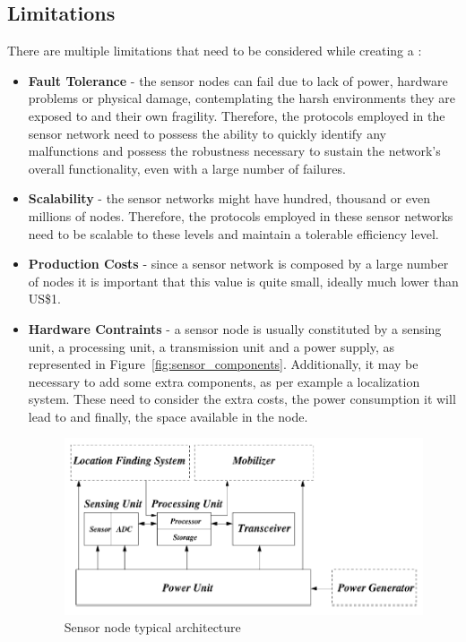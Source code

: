 


\subsection{Limitations}
\label{subsec:wsn_limitations}
There are multiple limitations that need to be considered while creating a 
\cite{Akyildiz2002, Matin2012}:
\begin{itemize}
      \item \textbf{Fault Tolerance} - the sensor nodes can fail due to lack of power, hardware
            problems or physical damage, contemplating the harsh environments they are exposed to
            and their own fragility. Therefore, the protocols employed in the sensor network
            need to possess the ability to quickly identify any malfunctions and possess the
            robustness necessary to sustain the network's overall functionality, even with a large
            number of failures.
      \item \textbf{Scalability} - the sensor networks might have hundred, thousand or even
            millions of nodes. Therefore, the protocols employed in these sensor networks need to
            be scalable to these levels and maintain a tolerable efficiency level.
      \item \textbf{Production Costs} - since a sensor network is composed by a large number of
            nodes it is important that this value is quite small, ideally much lower than US\$1.
      \item \textbf{Hardware Contraints} - a sensor node is usually constituted by a sensing
            unit, a processing unit, a transmission unit and a power supply, as represented in
            Figure~\ref{fig:sensor_components}. Additionally, it may be necessary to add some
            extra components, as per example a localization system. These need to consider the
            extra costs, the power consumption it will lead to and finally, the space available
            in the node.
            \begin{figure}[H]
                  \caption{Sensor node typical architecture \cite{Akyildiz2002}}
                  \centering
                  \includegraphics[scale=1]{Chapters/Figures/sensor_components.png}

\end{figure}
\end{itemize}
